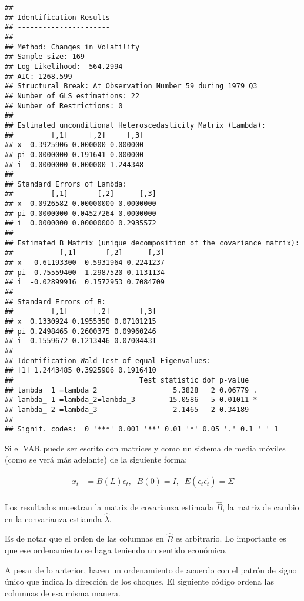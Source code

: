 \documentclass[
]{book}
\begin{document}
\begin{verbatim}
## 
## Identification Results
## ---------------------- 
## 
## Method: Changes in Volatility
## Sample size: 169
## Log-Likelihood: -564.2994
## AIC: 1268.599
## Structural Break: At Observation Number 59 during 1979 Q3
## Number of GLS estimations: 22
## Number of Restrictions: 0
## 
## Estimated unconditional Heteroscedasticity Matrix (Lambda):
##         [,1]     [,2]     [,3]
## x  0.3925906 0.000000 0.000000
## pi 0.0000000 0.191641 0.000000
## i  0.0000000 0.000000 1.244348
## 
## Standard Errors of Lambda:
##         [,1]       [,2]      [,3]
## x  0.0926582 0.00000000 0.0000000
## pi 0.0000000 0.04527264 0.0000000
## i  0.0000000 0.00000000 0.2935572
## 
## Estimated B Matrix (unique decomposition of the covariance matrix): 
##           [,1]       [,2]      [,3]
## x   0.61193300 -0.5931964 0.2241237
## pi  0.75559400  1.2987520 0.1131134
## i  -0.02899916  0.1572953 0.7084709
## 
## Standard Errors of B:
##         [,1]      [,2]       [,3]
## x  0.1330924 0.1955350 0.07101215
## pi 0.2498465 0.2600375 0.09960246
## i  0.1559672 0.1213446 0.07004431
## 
## Identification Wald Test of equal Eigenvalues:
## [1] 1.2443485 0.3925906 0.1916410
##                              Test statistic dof p-value  
## lambda_ 1 =lambda_2                  5.3828   2 0.06779 .
## lambda_ 1 =lambda_2=lambda_3        15.0586   5 0.01011 *
## lambda_ 2 =lambda_3                  2.1465   2 0.34189  
## ---
## Signif. codes:  0 '***' 0.001 '**' 0.01 '*' 0.05 '.' 0.1 ' ' 1
\end{verbatim}

Si el VAR puede ser escrito con matrices y como un sistema de media móviles (como se verá más adelante) de la siguiente forma:

\begin{align}
x_{t}&=B(L)\epsilon_{t},\;\;B(0)=I,\;\;E(\epsilon_{t}\epsilon_{t}^{'})=\Sigma 
\end{align}\\
Los resultados muestran la matriz de covarianza estimada \(\hat{B}\), la matriz de cambio en la convarianza estiamda \(\hat{\lambda}\).

Es de notar que el orden de las columnas en \(\hat{B}\) es arbitrario. Lo importante es que ese ordenamiento se haga teniendo un sentido económico.

A pesar de lo anterior, \citet{Herwartz2016} hacen un ordenamiento de acuerdo con el patrón de signo único que indica la dirección de los choques. El siguiente código ordena las columnas de esa misma manera.
\end{document}

